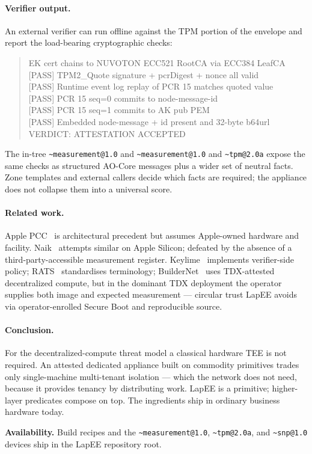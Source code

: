 \documentclass[10pt,a4paper]{article}
\begin{document}
\paragraph{Verifier output.} An external verifier can run offline
against the TPM portion of the envelope and report the load-bearing
cryptographic checks:
\begin{quote}\footnotesize\ttfamily
[PASS] EK cert chains to NUVOTON ECC521 RootCA via ECC384 LeafCA\\
{}[PASS] TPM2\_Quote signature + pcrDigest + nonce all valid\\
{}[PASS] Runtime event log replay of PCR 15 matches quoted value\\
{}[PASS] PCR 15 seq=0 commits to node-message-id\\
{}[PASS] PCR 15 seq=1 commits to AK pub PEM\\
{}[PASS] Embedded node-message + id present and 32-byte b64url\\
VERDICT: ATTESTATION ACCEPTED
\end{quote}
The in-tree \texttt{\~{}measurement@1.0} and
\texttt{\~{}measurement@1.0} and \texttt{\~{}tpm@2.0a} expose the same checks as
structured AO-Core messages plus a wider set of neutral facts. Zone
templates and external callers decide which facts are required; the
appliance does not collapse them into a universal score.

\paragraph{Related work.} Apple PCC~\cite{apple-pcc} is architectural
precedent but assumes Apple-owned hardware and facility.
Naik~\cite{naik-dginf} attempts similar on Apple Silicon; defeated by
the absence of a third-party-accessible measurement register.
Keylime~\cite{keylime} implements verifier-side policy;
RATS~\cite{rfc9334} standardises terminology;
BuilderNet~\cite{flashbots-buildernet} uses TDX-attested decentralized
compute, but in the dominant TDX deployment the operator supplies both
image and expected measurement --- circular trust LapEE avoids via
operator-enrolled Secure Boot and reproducible source.

\paragraph{Conclusion.} For the decentralized-compute threat model a
classical hardware TEE is not required. An attested dedicated appliance
built on commodity primitives trades only single-machine multi-tenant
isolation --- which the network does not need, because it provides
tenancy by distributing work. LapEE is a primitive; higher-layer
predicates compose on top. The ingredients ship in ordinary business
hardware today.

\vspace{0.4em}
\noindent\footnotesize\textbf{Availability.} Build recipes and the
\texttt{\~{}measurement@1.0}, \texttt{\~{}tpm@2.0a}, and
\texttt{\~{}snp@1.0} devices ship in the LapEE repository root.

\printbibliography
\end{document}

